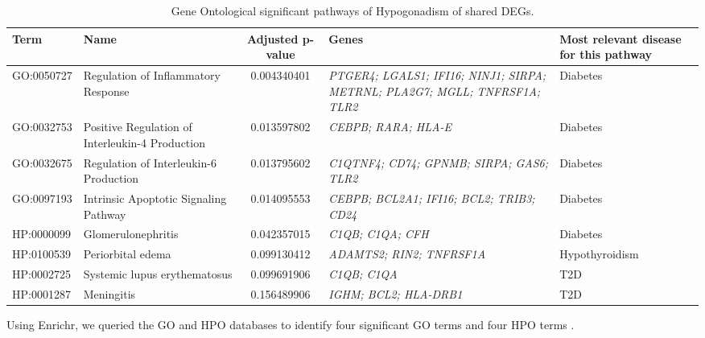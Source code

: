 \begin{table}[H]
\centering
\caption{Gene Ontological significant pathways of Hypogonadism of shared DEGs.}
\renewcommand{\arraystretch}{1.0} %
\small
\begin{tabularx}{\textwidth}{|l|X|c|X|X|}
\hline
\textbf{Term} & \textbf{Name} & \textbf{Adjusted p-value} & \textbf{Genes} & \textbf{Most relevant disease for this pathway} \\
\hline
GO:0050727 & Regulation of Inflammatory Response & 0.004340401 & \textit{PTGER4; LGALS1; IFI16; NINJ1; SIRPA; METRNL; PLA2G7; MGLL; TNFRSF1A; TLR2} & Diabetes \\
\hline
GO:0032753 & Positive Regulation of Interleukin-4 Production & 0.013597802 & \textit{CEBPB; RARA; HLA-E} & Diabetes \\
\hline
GO:0032675 & Regulation of Interleukin-6 Production & 0.013795602 & \textit{C1QTNF4; CD74; GPNMB; SIRPA; GAS6; TLR2} & Diabetes \\
\hline
GO:0097193 & Intrinsic Apoptotic Signaling Pathway & 0.014095553 & \textit{CEBPB; BCL2A1; IFI16; BCL2; TRIB3; CD24} & Diabetes \\
\hline
HP:0000099 & Glomerulonephritis & 0.042357015 & \textit{C1QB; C1QA; CFH} & Diabetes \\
\hline
HP:0100539 & Periorbital edema & 0.099130412 & \textit{ADAMTS2; RIN2; TNFRSF1A} & Hypothyroidism \\
\hline
HP:0002725 & Systemic lupus erythematosus & 0.099691906 & \textit{C1QB; C1QA} & T2D \\
\hline
HP:0001287 & Meningitis & 0.156489906 & \textit{IGHM; BCL2; HLA-DRB1} & T2D \\
\hline
\end{tabularx}
\end{table}


Using Enrichr, we queried the GO and HPO databases to identify four significant GO terms and four HPO terms \cite{6}.

